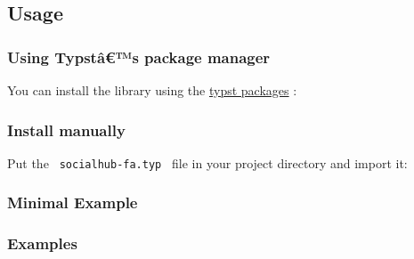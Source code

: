 \subsection{Usage}\label{usage}

\subsubsection{Using Typstâ€™s package
manager}\label{using-typstuxe2s-package-manager}

You can install the library using the
\href{https://github.com/typst/packages}{typst packages} :

\begin{Shaded}
\begin{Highlighting}[]
\end{Highlighting}
\end{Shaded}

\subsubsection{Install manually}\label{install-manually}

Put the \texttt{\ socialhub-fa.typ\ } file in your project directory and
import it:

\begin{Shaded}
\begin{Highlighting}[]
\end{Highlighting}
\end{Shaded}

\subsubsection{Minimal Example}\label{minimal-example}

\begin{Shaded}
\begin{Highlighting}[]

\end{Highlighting}
\end{Shaded}

\subsubsection{Examples}\label{examples}

